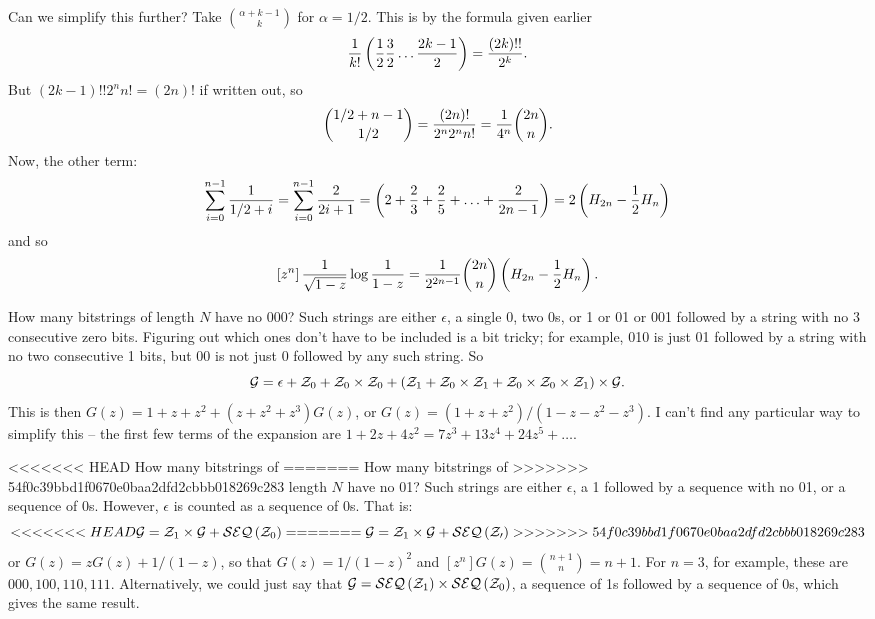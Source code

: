 Can we simplify this further?  Take $\alpha + k - 1 \choose k$ for $\alpha = 1/2$.
This is by the formula given earlier 
$$
 {1 \over k!} \left({1 \over 2} {3 \over 2} \ldots {2k - 1 \over 2}\right) =
  {\left(2k\right)!! \over 2^k}.
$$
But $\left(2k - 1\right)!! 2^n n! = \left(2 n\right)!$ if written out,
so
$$
 {1/2 + n - 1 \choose 1/2} = {\left(2 n\right)! \over 2^n 2^n n!} = {1 \over 4^n} {2n \choose n}.
$$
Now, the other term:
$$
 \sum_{i=0}^{n-1} {1 \over 1/2 + i} = \sum_{i=0}^{n-1} {2 \over 2 i + 1}
  = \left(2 + {2 \over 3} + {2 \over 5} + \ldots + {2 \over 2 n - 1}\right)
  = 2 \left(H_{2n} - {1 \over 2} H_n\right)
$$
and so
$$
 \left[z^n\right] {1 \over \sqrt{1 - z}} \log {1 \over 1 - z} =
  {1 \over 2^{2n-1}} {2n \choose n} \left(H_{2n} - {1 \over 2} H_n\right).
$$

\vskip 0.08in  How many bitstrings of
length $N$ have no 000?\hfil\break
Such strings are either $\epsilon$, a single 0, two 0s, or 1 or 01 or 001 followed
by a string with no 3 consecutive zero bits.  Figuring out which ones
don't have to be included is a bit tricky; for example, 010 is just 01 followed
by a string with no two consecutive 1 bits, but 00 is not just 0 followed
by any such string.  So
$$
 {\cal G} = \epsilon + {\cal Z}_0 + {\cal Z}_0 \times {\cal Z}_0
   + \left({\cal Z}_1 + {\cal Z}_0 \times {\cal Z}_1 
   + {\cal Z}_0 \times {\cal Z}_0 \times {\cal Z}_1\right) \times {\cal G}.
$$
This is then $G\left(z\right) = 1 + z + z^2 + \left(z + z^2 + z^3\right) G\left(z\right)$,
or $G\left(z\right) = \left(1 + z + z^2\right) / \left(1 - z - z^2 - z^3\right)$.  I can't
find any particular way to simplify this -- the first few terms of the expansion
are $1 + 2z + 4z^2 = 7z^3 + 13z^4 + 24z^5 + \ldots$.

<<<<<<< HEAD
\vskip 0.08in  How many bitstrings of
=======
\vskip 0.08in  How many bitstrings of
>>>>>>> 54f0c39bbd1f0670e0baa2dfd2cbbb018269c283
length $N$ have no 01?\hfil\break
Such strings are either $\epsilon$, a 1 followed by a sequence with no 01,
or a sequence of 0s.  However, $\epsilon$ is counted as a sequence of 0s. That is:
$$
<<<<<<< HEAD
 {\cal G} = {\cal Z}_1 \times {\cal G} + {\cal SEQ}\left({\cal Z}_0\right)
=======
 {\cal G} = {\cal Z}_1 \times {\cal G} + {\cal SEQ}\left({\cal Z_0}\right)
>>>>>>> 54f0c39bbd1f0670e0baa2dfd2cbbb018269c283
$$
or $G\left(z\right) = z G\left(z\right) + 1 /\left( 1 - z \right) $, so that
$G\left(z\right) = 1 / \left(1 - z\right)^2$ and $\left[z^n\right] G\left(z\right) =
{n + 1 \choose n} = n + 1$.  For $n=3$, for example, these are
$000, 100, 110, 111$.  Alternatively, we could just say that
${\cal G} = {\cal SEQ}\left({\cal Z}_1\right) \times {\cal SEQ}\left({\cal Z}_0\right)$,
a sequence of 1s followed by a sequence of 0s, which gives the same result.

